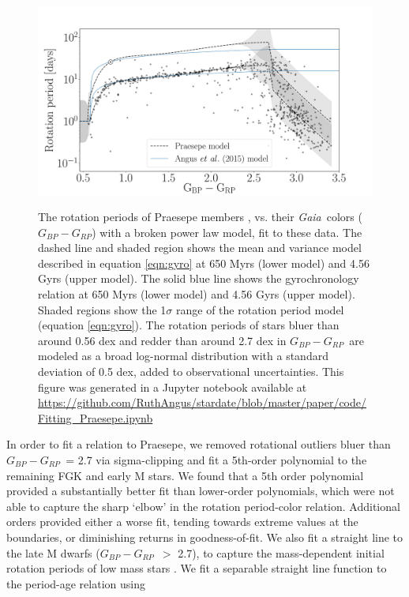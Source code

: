 \documentclass[useAMS, usenatbib, preprint, 12pt]{aastex}
\newcommand{\Gaia}{{\it Gaia}}
\newcommand{\gcolor}{$G_{BP} - G_{RP}$}
\newcommand{\racomment}[1]{{\bf #1}}
\begin{document}
\begin{figure}
  \caption{
    The rotation periods of Praesepe members \citep{douglas2016},
    vs. their \Gaia\ colors (\gcolor) with a broken power law model, fit to
    these data.
    The dashed line and shaded region shows the mean and variance model
    described in equation \ref{eqn:gyro} at 650 Myrs (lower model) and 4.56
    Gyrs (upper model).
    The solid blue line shows the \citep{angus2015} gyrochronology relation at
    650 Myrs (lower model) and 4.56 Gyrs (upper model).
    Shaded regions show the 1$\sigma$ range of the rotation period
    model (equation \ref{eqn:gyro}).
    The rotation periods of stars bluer than around 0.56 dex and redder than
    around 2.7 dex in \gcolor\ are modeled as a broad log-normal distribution
    with a standard deviation of 0.5 dex, added to observational
    uncertainties.
    This figure was generated in a Jupyter notebook available at
    \url{https://github.com/RuthAngus/stardate/blob/master/paper/code/Fitting_Praesepe.ipynb}
}
  \centering
    \includegraphics[width=1.1\textwidth]{praesepe}
\label{fig:praesepe}
\end{figure}
In order to fit a relation to Praesepe, we removed rotational outliers bluer
than \gcolor\ = 2.7 via sigma-clipping and fit a 5th-order polynomial to the
remaining FGK and early M stars.
    We found that a 5th order polynomial provided a substantially
better fit than lower-order polynomials, which were not able to capture the
sharp `elbow’ in the rotation period-color relation. Additional orders
provided either a worse
fit, tending towards extreme values at the boundaries, or diminishing returns
in goodness-of-fit.
We also fit a straight line to the late M dwarfs (\gcolor\ $>$ 2.7), to
capture the mass-dependent initial rotation periods of low mass stars
\citep{somers2017}.
We fit a separable straight line function to the period-age relation using
\end{document}
